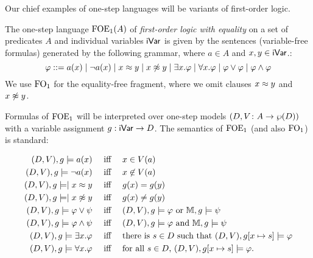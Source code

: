 Our chief examples of one-step languages will be variants of first-order logic.

\begin{definition}
The one-step language $\mathrm{FOE}_1(A)$ of \emph{first-order logic with equality} on a set of predicates $A$ and individual variables $\mathsf{iVar}$ is given by the sentences (variable-free formulas) generated by the following grammar, where $a \in A$ and $x,y\in\mathsf{iVar}$.:
\begin{equation}\label{eq:grammarofoe}
\varphi ::= a(x) \mid \lnot a(x) \mid x \foeq y \mid x \not\foeq y \mid \exists x.\varphi \mid \forall x.\varphi \mid \varphi \lor \varphi \mid \varphi \land \varphi
\end{equation}
We use $\mathrm{FO}_1$ for the equality-free fragment, where we omit clauses $x \approx y$ and $x \not\approx y$.
\end{definition}


Formulas of $\mathrm{FOE}_1$ will be interpreted over one-step models $(D,V \colon A \to \wp(D))$ with a variable assignment $g: \mathsf{iVar} \to D$. The semantics of $\mathrm{FOE}_1$ (and also $\mathrm{FO}_1$) is standard:
%

\begin{align*}
(D, \val),\ass \models a(x) & \quad\text{ iff }\quad  x \in \val(a) \\
(D, \val),\ass \models \lnot a(x) & \quad\text{ iff }\quad  x \not\in \val(a) \\
(D, \val),\ass \models \mid x \foeq y & \quad\text{ iff }\quad \ass(x) = \ass(y) \\
(D, \val),\ass \models \mid x \not\foeq y & \quad\text{ iff }\quad \ass(x) \neq \ass(y) \\
(D, \val),\ass \models \varphi\lor\psi & \quad\text{ iff }\quad  (D, \val),\ass \models \varphi \text{ or } \npmodel,\ass \models \psi \\
(D, \val),\ass \models \varphi\land\psi & \quad\text{ iff }\quad  (D, \val),\ass \models \varphi \text{ and } \npmodel,\ass \models \psi \\
(D, \val),\ass \models \exists x.\varphi & \quad\text{ iff }\quad  \text{there is $s \in D$ such that $(D, \val), \ass[x\mapsto s] \models \varphi$}\\
(D, \val),\ass \models \forall x.\varphi & \quad\text{ iff }\quad  \text{for all $s \in D$, } (D, \val), \ass[x\mapsto s] \models \varphi.
\end{align*}

